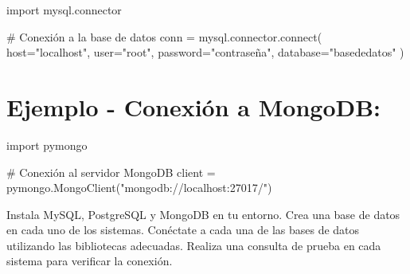 \documentclass[
  a4paper,
  DIV=11,
  numbers=noendperiod,
  onepage,
  openany]{scrreprt}
\newenvironment{Shaded}{\begin{snugshade}}{\end{snugshade}}
\newcommand{\CommentTok}[1]{\textcolor[rgb]{0.37,0.37,0.37}{#1}}
\newcommand{\ExtensionTok}[1]{\textcolor[rgb]{0.00,0.23,0.31}{#1}}
\newcommand{\ImportTok}[1]{\textcolor[rgb]{0.00,0.46,0.62}{#1}}
\newcommand{\NormalTok}[1]{\textcolor[rgb]{0.00,0.23,0.31}{#1}}
\newcommand{\OperatorTok}[1]{\textcolor[rgb]{0.37,0.37,0.37}{#1}}
\newcommand{\StringTok}[1]{\textcolor[rgb]{0.13,0.47,0.30}{#1}}
\begin{document}
\begin{Shaded}
\begin{Highlighting}[]
\ImportTok{import}\NormalTok{ mysql.connector}

\CommentTok{\# Conexión a la base de datos}
\NormalTok{conn }\OperatorTok{=}\NormalTok{ mysql.connector.}\ExtensionTok{connect}\NormalTok{(}
\NormalTok{    host}\OperatorTok{=}\StringTok{"localhost"}\NormalTok{,}
\NormalTok{    user}\OperatorTok{=}\StringTok{"root"}\NormalTok{,}
\NormalTok{    password}\OperatorTok{=}\StringTok{"contraseña"}\NormalTok{,}
\NormalTok{    database}\OperatorTok{=}\StringTok{"basededatos"}
\NormalTok{)}
\end{Highlighting}
\end{Shaded}

\hypertarget{ejemplo---conexiuxf3n-a-mongodb}{%
\section{Ejemplo - Conexión a
MongoDB:}\label{ejemplo---conexiuxf3n-a-mongodb}}

\begin{Shaded}
\begin{Highlighting}[]
\ImportTok{import}\NormalTok{ pymongo}

\CommentTok{\# Conexión al servidor MongoDB}
\NormalTok{client }\OperatorTok{=}\NormalTok{ pymongo.MongoClient(}\StringTok{"mongodb://localhost:27017/"}\NormalTok{)}
\end{Highlighting}
\end{Shaded}

\begin{tcolorbox}[enhanced jigsaw, colbacktitle=quarto-callout-important-color!10!white, toprule=.15mm, leftrule=.75mm, titlerule=0mm, opacityback=0, rightrule=.15mm, opacitybacktitle=0.6, breakable, left=2mm, coltitle=black, title=\textcolor{quarto-callout-important-color}{\faExclamation}\hspace{0.5em}{Actividad Práctica:}, toptitle=1mm, bottomtitle=1mm, arc=.35mm, bottomrule=.15mm, colback=white, colframe=quarto-callout-important-color-frame]

Instala MySQL, PostgreSQL y MongoDB en tu entorno. Crea una base de
datos en cada uno de los sistemas. Conéctate a cada una de las bases de
datos utilizando las bibliotecas adecuadas. Realiza una consulta de
prueba en cada sistema para verificar la conexión.

\end{tcolorbox}
\end{document}
